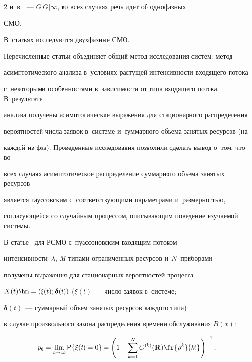 \begin{multicols}{2}
и~в~\cite{Mois_1_2017}~--- $G|G|\infty$, во всех случаях речь идет об однофазных 


СМО.


В~статьях \cite{Mois_4_2017,Mois_5_2017} исследуются двухфазные СМО.


Перечисленные статьи объединяет общий метод исследования сис\-тем: метод 


асимптотического анализа в~условиях растущей интенсивности входящего потока 


с~некоторыми особенностями в~зависимости от типа входящего потока. В~результате 


анализа получены асимптотические выражения для стационарного распределения 


вероятностей числа заявок в~сис\-те\-ме и~суммарного объема занятых ресурсов (на 


каждой из фаз). Проведенные исследования позволили сделать вывод о~том, что во 


всех случаях асимптотическое распределение суммарного объема занятых ресурсов 


является гауссовским с~соответствующими параметрами и~размерностью, 


согласующейся со случайным процессом, описывающим поведение изучаемой сис\-темы.





В статье~\cite{Naumov_18_2016} для РСМО с~пуассоновским входящим потоком 


интенсивности~$\lambda$, $M$ типами ограниченных ресурсов и~$N$~приборами 


получены выражения для стационарных вероятностей процесса 


$X(t)\hm=(\xi(t);\boldsymbol{\delta}(t))$ ($\xi(t)$~--- число заявок в~сис\-те\-ме; 


$\boldsymbol{\delta}(t)$~--- суммарный объем занятых ресурсов каждого типа)




в случае произвольного закона распределения времени обслуживания $B(x)$:


\begin{equation*}


p_0=\lim\limits_{t\rightarrow \infty}{\sf P}\{\xi(t)=0\}=\left(1+\sum\limits_{k=1}^{N}


G^{(k)}(\mathbf{R})\fr{\rho^{k}}{k!} \right ) ^{-1};


\end{equation*}






\end{multicols}
